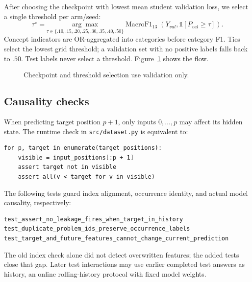 \documentclass[11pt]{article}
\newcommand{\code}[1]{\texttt{\small #1}}
\begin{document}
After choosing the checkpoint with lowest mean student validation loss, we select a single threshold per arm/seed:
\begin{equation}
\tau^{\star}=\underset{\tau\in\{.10,.15,.20,.25,.30,.35,.40,.50\}}{\arg\max}
\operatorname{MacroF1}_{13}(Y_{val},\mathbb{1}[P_{val}\geq\tau]).
\end{equation}
Concept indicators are OR-aggregated into categories before category F1. Ties select the lowest grid threshold; a validation set with no positive labels falls back to $.50$. Test labels never select a threshold. Figure~\ref{fig:threshold} shows the flow.
\begin{figure}[htbp]\centering
{}
\caption{Checkpoint and threshold selection use validation only.}\label{fig:threshold}
\end{figure}

\subsection{Causality checks}
When predicting target position $p+1$, only inputs $0,\ldots,p$ may affect its hidden state. The runtime check in \code{src/dataset.py} is equivalent to:
\begin{lstlisting}
for p, target in enumerate(target_positions):
    visible = input_positions[:p + 1]
    assert target not in visible
    assert all(v < target for v in visible)
\end{lstlisting}
The following tests guard index alignment, occurrence identity, and actual model causality, respectively:
\begin{lstlisting}
test_assert_no_leakage_fires_when_target_in_history
test_duplicate_problem_ids_preserve_occurrence_labels
test_target_and_future_features_cannot_change_current_prediction
\end{lstlisting}
 The old index check alone did not detect overwritten features; the added tests close that gap. Later test interactions may use earlier completed test answers as history, an online rolling-history protocol with fixed model weights.
\end{document}
